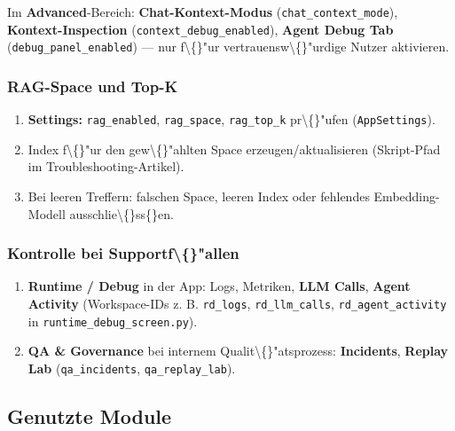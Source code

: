 Im \textbf{Advanced}-Bereich: \textbf{Chat-Kontext-Modus} (\texttt{chat\_context\_mode}), \textbf{Kontext-Inspection} (\texttt{context\_debug\_enabled}), \textbf{Agent Debug Tab} (\texttt{debug\_panel\_enabled}) --- nur f\textbackslash\{\}"ur vertrauensw\textbackslash\{\}"urdige Nutzer aktivieren.

\subsubsection{RAG-Space und Top-K}

\begin{enumerate}
\item \textbf{Settings:} \texttt{rag\_enabled}, \texttt{rag\_space}, \texttt{rag\_top\_k} pr\textbackslash\{\}"ufen (\texttt{AppSettings}).
\item Index f\textbackslash\{\}"ur den gew\textbackslash\{\}"ahlten Space erzeugen/aktualisieren (Skript-Pfad im Troubleshooting-Artikel).
\item Bei leeren Treffern: falschen Space, leeren Index oder fehlendes Embedding-Modell ausschlie\textbackslash\{\}ss\{\}en.
\end{enumerate}

\subsubsection{Kontrolle bei Supportf\textbackslash\{\}"allen}

\begin{enumerate}
\item \textbf{Runtime / Debug} in der App: Logs, Metriken, \textbf{LLM Calls}, \textbf{Agent Activity} (Workspace-IDs z. B. \texttt{rd\_logs}, \texttt{rd\_llm\_calls}, \texttt{rd\_agent\_activity} in \texttt{runtime\_debug\_screen.py}).
\item \textbf{QA \& Governance} bei internem Qualit\textbackslash\{\}"atsprozess: \textbf{Incidents}, \textbf{Replay Lab} (\texttt{qa\_incidents}, \texttt{qa\_replay\_lab}).
\end{enumerate}

\subsection{Genutzte Module}

